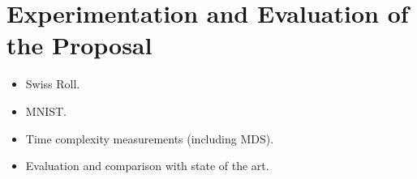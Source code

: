 \section{Experimentation and Evaluation of the Proposal}

\begin{itemize}
    \item Swiss Roll.
    \item MNIST.
    \item Time complexity measurements (including MDS).
    \item Evaluation and comparison with state of the art.
\end{itemize}
